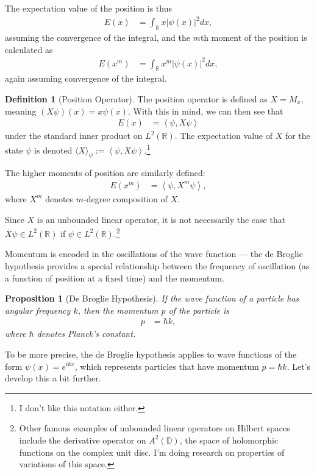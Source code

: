 \documentclass[10pt]{extarticle}
\newcommand{\R}{\mathbb{R}}
\newcommand{\iprod}[2]{\left\langle #1,#2\right\rangle}
\theoremstyle{plain}
\newtheorem*{proposition}{Proposition}%
\theoremstyle{definition}
\newtheorem*{definition}{Definition}
\theoremstyle{remark}
\renewcommand{\newline}{\hfill\break}
\begin{document}
  The expectation value of the position is thus
  \begin{align*}
    E(x) &= \int_{\R}x\left\vert \psi(x) \right\vert^2dx,
  \end{align*}
  assuming the convergence of the integral, and the $m$th moment of the position is calculated as
  \begin{align*}
    E(x^m) &= \int_{\R}x^m\left\vert \psi(x) \right\vert^2dx,
  \end{align*}
  again assuming convergence of the integral.
  \begin{definition}[Position Operator]
    The position operator is defined as $X = M_{x}$, meaning $(X\psi)(x) = x\psi(x)$. With this in mind, we can then see that
    \begin{align*}
      E(x) &= \iprod{\psi}{X\psi}
    \end{align*}
    under the standard inner product on $L^{2}(\R)$. The expectation value of $X$ for the state $\psi$ is denoted $\langle X \rangle_{\psi} := \iprod{\psi}{X\psi}$.\footnote{I don't like this notation either.}\newline

    The higher moments of position are similarly defined:
    \begin{align*}
      E(x^m) &= \iprod{\psi}{X^{m}\psi},
    \end{align*}
    where $X^{m}$ denotes $m$-degree composition of $X$.\newline

    Since $X$ is an unbounded linear operator, it is not necessarily the case that $X\psi \in L^{2}(\R)$ if $\psi\in L^{2}(\R)$.\footnote{Other famous examples of unbounded linear operators on Hilbert spaces include the derivative operator on $A^{2}(\mathbb{D})$, the space of holomorphic functions on the complex unit disc. I'm doing research on properties of variations of this space.}
  \end{definition}
  Momentum is encoded in the oscillations of the wave function --- the de Broglie hypothesis provides a special relationship between the frequency of oscillation (as a function of position at a fixed time) and the momentum.
  \begin{proposition}[De Broglie Hypothesis]
    If the wave function of a particle has angular frequency $k$, then the momentum $p$ of the particle is
    \begin{align*}
      p &= \hbar k,
    \end{align*}
    where $\hbar$ denotes Planck's constant.
  \end{proposition}
  To be more precise, the de Broglie hypothesis applies to wave functions of the form $\psi(x) = e^{ikx}$, which represents particles that have momentum $p = \hbar k$. Let's develop this a bit further.\newline
\end{document}
